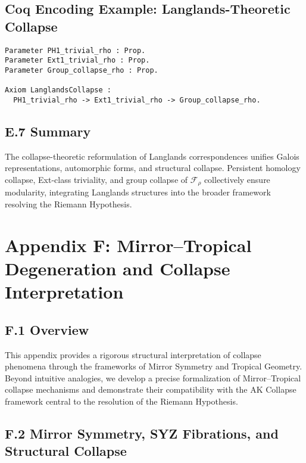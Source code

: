 \documentclass[11pt]{article}
\begin{document}
\subsection*{Coq Encoding Example: Langlands-Theoretic Collapse}

\begin{lstlisting}[language=Coq, caption=Coq Formalization of Langlands-Theoretic Collapse, captionpos=b]
Parameter PH1_trivial_rho : Prop.
Parameter Ext1_trivial_rho : Prop.
Parameter Group_collapse_rho : Prop.

Axiom LanglandsCollapse :
  PH1_trivial_rho -> Ext1_trivial_rho -> Group_collapse_rho.
\end{lstlisting}

\subsection*{E.7 Summary}

The collapse-theoretic reformulation of Langlands correspondences unifies Galois representations, automorphic forms, and structural collapse. Persistent homology collapse, Ext-class triviality, and group collapse of $\mathcal{F}_\rho$ collectively ensure modularity, integrating Langlands structures into the broader framework resolving the Riemann Hypothesis.



\section*{Appendix F: Mirror–Tropical Degeneration and Collapse Interpretation}

\subsection*{F.1 Overview}

This appendix provides a rigorous structural interpretation of collapse phenomena through the frameworks of Mirror Symmetry and Tropical Geometry. Beyond intuitive analogies, we develop a precise formalization of Mirror–Tropical collapse mechanisms and demonstrate their compatibility with the AK Collapse framework central to the resolution of the Riemann Hypothesis.

\subsection*{F.2 Mirror Symmetry, SYZ Fibrations, and Structural Collapse}
\end{document}
